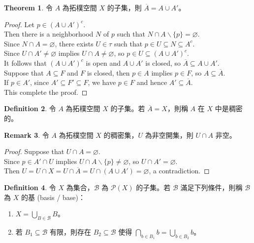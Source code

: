 \documentclass[12pt]{article}
\theoremstyle{definition}
\newtheorem{definition}{Definition}[section]
\newtheorem{theorem}[definition]{Theorem}
\newtheorem{remark}[definition]{Remark}
\newcommand\<{\langle}
\renewcommand\>{\rangle}
\begin{document}
\begin{CJK}{UTF8}{bsmi}
\begin{theorem}
    令 $A$ 為拓樸空間 $X$ 的子集，則 $\overline{A}=A\cup A'$。
\end{theorem}
\begin{proof}
    Let $p\in(A\cup A')^c$. \\
    Then there is a neighborhood $N$ of $p$ such that $N\cap A\backslash\{p\}=\varnothing$. \\
    Since $N\cap A=\varnothing$, there exists $U\in\tau$ such that $p\in U\subseteq N\subseteq A^c$. \\
    Since $U\cap A'\ne\varnothing$ implies $U\cap A\ne\varnothing$, so $p\in U\subseteq(A\cup A')^c$. \\
    It follows that $(A\cup A')^c$ is open and $A\cup A'$ is closed, so $\overline{A}\subseteq A\cup A'$. \\
    Suppose that $A\subseteq F$ and $F$ is closed, then $p\in A$ implies $p\in F$, so $A\subseteq\overline{A}$. \\
    If $p\in A'$, since $A'\subseteq F'\subseteq F$, we have $p\in F$ and hence $A'\subseteq\overline{A}$. \\
    This complete the proof.
\end{proof}

\begin{definition}
    令 $A$ 為拓樸空間 $X$ 的子集。若 $\overline{A}=X$，則稱 $A$ 在 $X$ 中是稠密的。
\end{definition}

\begin{remark}
\label{each open set cap dense set is non-empty}
    令 $A$ 為拓樸空間 $X$ 的稠密集，$U$ 為非空開集，則 $U\cap A$ 非空。
\end{remark}
\begin{proof}
    Suppose that $U\cap A=\varnothing$. \\
    Since $p\in A'\cap U$ implies $U\cap A\backslash\{p\}\ne\varnothing$, so $U\cap A'=\varnothing$. \\
    Then $U=U\cap X=U\cap\overline{A}=U\cap(A\cup A')=\varnothing$, a contradiction.
\end{proof}

\begin{definition}
    令 $X$ 為集合，$\mathcal{B}$ 為 $\mathcal{P}(X)$ 的子集。若 $\mathcal{B}$ 滿足下列條件，則稱 $\mathcal{B}$ 為 $X$ 的基 (basis / base)：
    \begin{enumerate}
        \item $X=\bigcup_{B\in\mathcal{B}}B$。
        \item 若 $B_1\subseteq\mathcal{B}$ 有限，則存在 $B_2\subseteq\mathcal{B}$ 使得 $\bigcap_{b\in B_1}b=\bigcup_{b\in B_2}b$。
    \end{enumerate}
\end{definition}


\end{CJK}
\end{document}
